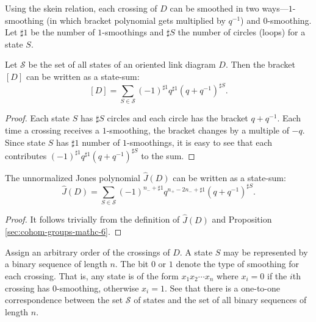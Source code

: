 Using the skein relation, each crossing of $D$ can be smoothed in two ways---$1$-smoothing (in which bracket polynomial gets multiplied by $q^{-1}$) and $0$-smoothing. Let $\sharp 1$ be the number of $1$-smoothings and $\sharp S$ the number of circles (loops) for a state $S$.

\begin{proposition}
\label{sec:cohom-groups-mathc-6}
Let $\mathcal{S}$ be the set of all states of an oriented link diagram $D$. Then the bracket $[D]$ can be written as a state-sum: 
\begin{equation}
\label{eq:5}
[D] = \sum_{S \in \mathcal{S}}^{} (-1)^{\sharp 1} q^{\sharp 1} (q + q^{-1})^{\sharp S}.
\end{equation}
\end{proposition}

\begin{proof}
\label{sec:cohom-groups-mathc-8}
Each state $S$ has $\sharp S$ circles and each circle has the bracket $q + q^{-1}$. Each time a crossing receives a $1$-smoothing, the bracket changes by a multiple of $-q$. Since state $S$ has $\sharp 1$ number of $1$-smoothings, it is easy to see that each contributes $(-1)^{\sharp 1} q^{\sharp 1} (q + q^{-1})^{\sharp S}$ to the sum. 
\end{proof}

\begin{theorem}
\label{sec:cohom-groups-mathc-9}
The unnormalized Jones polynomial $\hat{J}(D)$ can be written as a state-sum: 
\begin{equation}
\label{eq:6}
\hat{J}(D) = \sum_{S\in \mathcal{S}}^{} (-1)^{n_- + \sharp 1} q^{n_+ - 2n_- + \sharp 1} (q+q^{-1})^{\sharp S}.
\end{equation}
\end{theorem}

\begin{proof}
\label{sec:cohom-groups-mathc-10}
It follows trivially from the definition of $\hat{J}(D)$ and Proposition \ref{sec:cohom-groups-mathc-6}.
\end{proof}

Assign an arbitrary order of the crossings of $D$. A state $S$ may be represented by a binary sequence of length $n$. The bit $0$ or $1$ denote the type of smoothing for each crossing. That is, any state is of the form $x_1x_2\cdots x_n$ where $x_i = 0$ if the $i$th crossing has $0$-smoothing, otherwise $x_i = 1$. See that there is a one-to-one correspondence between the set $\mathcal{S}$ of states and the set of all binary sequences of length $n$.

